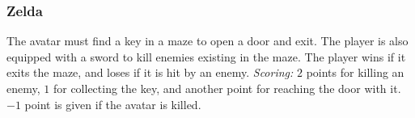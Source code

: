 \documentclass[conference]{IEEEtran}
\begin{document}
\subsubsection{ Zelda} The avatar must find a key in a maze to open a door and exit. The player is also equipped with a sword to kill enemies existing in the maze. The player wins if it exits the maze, and loses if it is hit by an enemy. \textit{Scoring:} $2$ points for killing an enemy, $1$ for collecting the key, and another point for reaching the door with it. $-1$ point is given if the avatar is killed. 


\end{document}
